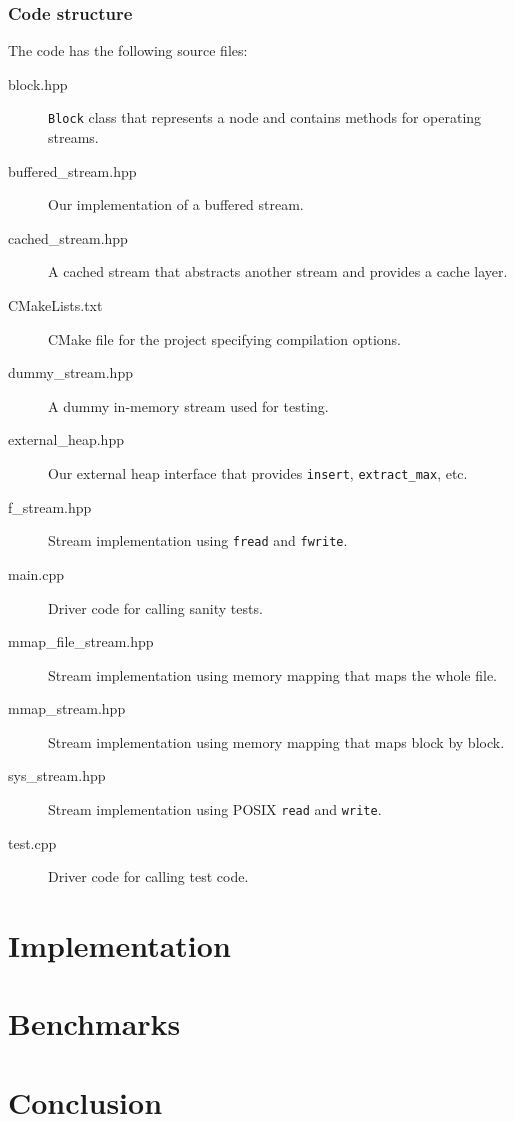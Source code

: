 \documentclass[a4paper,12pt]{article}
\begin{document}
\subsubsection{Code structure}
The code has the following source files:
\begin{description}


\item[block.hpp] \texttt{Block} class that represents a node and contains methods for operating streams.

\item[buffered\_stream.hpp] Our implementation of a buffered stream.

\item[cached\_stream.hpp] A cached stream that abstracts another stream and provides a cache layer.

\item[CMakeLists.txt] CMake file for the project specifying
  compilation options.

\item[dummy\_stream.hpp] A dummy in-memory stream used for testing.

\item[external\_heap.hpp] Our external heap interface that provides \texttt{insert}, \texttt{extract\_max}, etc.

\item[f\_stream.hpp] Stream implementation using \texttt{fread} and \texttt{fwrite}.

\item[main.cpp] Driver code for calling sanity tests.

\item[mmap\_file\_stream.hpp] Stream implementation using memory mapping that maps the whole file.

\item[mmap\_stream.hpp] Stream implementation using memory mapping that maps block by block.

\item[sys\_stream.hpp] Stream implementation using POSIX \texttt{read} and \texttt{write}.

\item[test.cpp] Driver code for calling test code.

\end{description}

\section{Implementation}


\section{Benchmarks}


\section{Conclusion}


\clearpage{}
\end{document}
